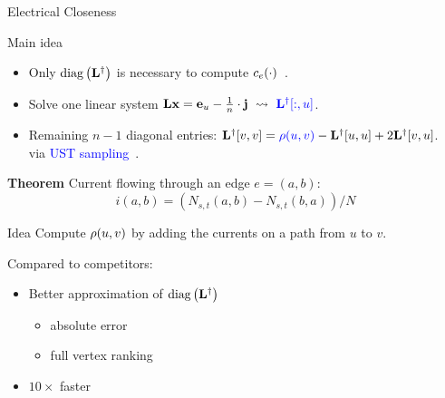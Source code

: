 \documentclass[10pt,titlepage,english,presentation]{beamer}
\newcommand{\emphcolor}{blue}
\renewcommand{\emph}[1]{\textcolor{\emphcolor}{#1}}
\begin{document}
\begin{frame}[t]{Electrical Closeness}
\footnotesize
%

\begin{block}{\footnotesize Main idea}
\begin{itemize}
\footnotesize

\item[\faHandORight] Only $\text{diag}\left(\mathbf{L}^\dagger\right)$ is necessary to compute
$c_e(\cdot)$~\parencite{DBLP:journals/socnet/BozzoF13}.%

\item[\faHandORight] Solve one linear system $\Lapl\vect{x} = \cunit{u} - \frac{1}{n}\cdot\ones\ \leadsto\ \emph{\Linv[:, u]}$.

\item[\faHandORight] Remaining $n-1$ diagonal entries: $\Linv[v,v] = \emph{\rdist(u, v)} - \Linv[u, u] + 2\Linv[v, u]$.\\

via \emph{UST sampling}~\parencite{DBLP:conf/esa/AngrimanPGM20}.
\end{itemize}
\end{block}\vspace{-5mm}

\begin{minipage}[t]{.48\textwidth}
\begin{block}{\footnotesize\textbf{Theorem}}
    Current flowing through an edge $e = (a, b)$:
    $$i(a, b) = (N_{s, t}(a, b) - N_{s, t}(b, a)) / N$$
\end{block}
\end{minipage}\hfill
\begin{minipage}[t]{.48\textwidth}
\begin{block}{\footnotesize Idea}
Compute $\rho(u, v)$ by adding the currents on a path from $u$ to $v$.
\end{block}
\end{minipage}

\begin{minipage}[t]{.5\textwidth}
\footnotesize\medskip

Compared to competitors:
\begin{itemize}
    \footnotesize
\item[\faThumbsOUp] Better approximation of $\text{diag}\left(\mathbf{L}^\dagger\right)$
    \begin{itemize}
    \scriptsize
        \item absolute error
        \item full vertex ranking
    \end{itemize}
\item[\faThumbsOUp] $10\times$ faster
\end{itemize}
\end{minipage}\hfill
\begin{minipage}[t]{.5\textwidth}
    \centering\vspace*{1mm}\scriptsize


\end{minipage}
\end{frame}
\end{document}
